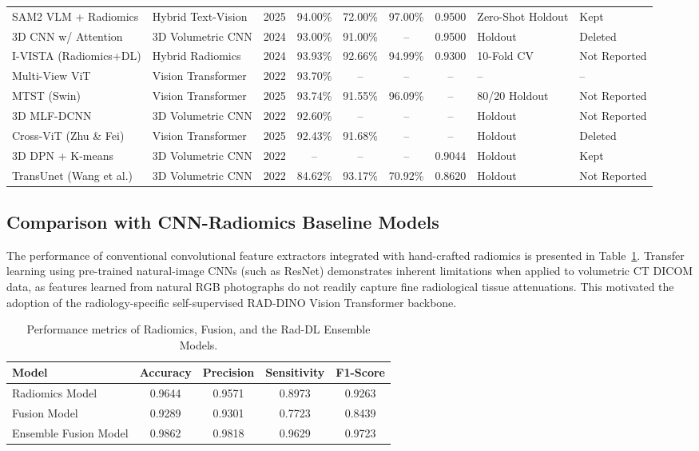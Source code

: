 \documentclass{iopjournal}
\begin{document}
\begin{longtable}{p{3.2cm} p{2.1cm} c c c c c p{1.8cm} p{1.7cm}}
SAM2 VLM + Radiomics & Hybrid Text-Vision & 2025 & 94.00\% & 72.00\% & 97.00\%
& 0.9500 & Zero-Shot Holdout & Kept \\
3D CNN w/ Attention & 3D Volumetric CNN & 2024 & 93.00\% & 91.00\% & -- &
0.9500 & Holdout & Deleted \\
I-VISTA (Radiomics+DL) & Hybrid Radiomics & 2024 & 93.93\% & 92.66\% & 94.99\%
& 0.9300 & 10-Fold CV & Not Reported \\
Multi-View ViT & Vision Transformer & 2022 & 93.70\% & -- & -- & -- & -- & -- \\
MTST (Swin) & Vision Transformer & 2025 & 93.74\% & 91.55\% & 96.09\% & -- &
80/20 Holdout & Not Reported \\
3D MLF-DCNN & 3D Volumetric CNN & 2022 & 92.60\% & -- & -- & -- & Holdout &
Not Reported \\
Cross-ViT (Zhu \& Fei) & Vision Transformer & 2025 & 92.43\% & 91.68\% & -- &
-- & Holdout & Deleted \\
3D DPN + K-means & 3D Volumetric CNN & 2022 & -- & -- & -- & 0.9044 & Holdout &
Kept \\
TransUnet (Wang et al.) & 3D Volumetric CNN & 2022 & 84.62\% & 93.17\% &
70.92\% & 0.8620 & Holdout & Not Reported \\
\end{longtable}

\subsection{Comparison with CNN-Radiomics Baseline Models}

The performance of conventional convolutional feature extractors integrated with
hand-crafted radiomics is presented in Table~\ref{tab:baseline_cnn}. Transfer
learning using pre-trained natural-image CNNs (such as ResNet) demonstrates
inherent limitations when applied to volumetric CT DICOM data, as features learned
from natural RGB photographs do not readily capture fine radiological tissue
attenuations. This motivated the adoption of the radiology-specific self-supervised
RAD-DINO Vision Transformer backbone.

\begin{table}[h]
\centering
\caption{Performance metrics of Radiomics, Fusion, and the Rad-DL Ensemble Models.}\label{tab:baseline_cnn}
\begin{tabular}{lcccc}
\toprule
\textbf{Model} & \textbf{Accuracy} & \textbf{Precision} & \textbf{Sensitivity} & \textbf{F1-Score} \\
\midrule
Radiomics Model & 0.9644 & 0.9571 & 0.8973 & 0.9263 \\
Fusion Model & 0.9289 & 0.9301 & 0.7723 & 0.8439 \\
Ensemble Fusion Model & 0.9862 & 0.9818 & 0.9629 & 0.9723 \\
\bottomrule
\end{tabular}
\end{table}
\end{document}
